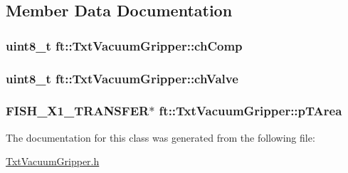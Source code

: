 \subsection{Member Data Documentation}
\subsubsection[{\texorpdfstring{ch\+Comp}{chComp}}]{\setlength{\rightskip}{0pt plus 5cm}uint8\+\_\+t ft\+::\+Txt\+Vacuum\+Gripper\+::ch\+Comp\hspace{0.3cm}{\ttfamily [protected]}}\hypertarget{classft_1_1_txt_vacuum_gripper_a28c6fcf1bb14dd5d00a9578f291c9fc4}{}\label{classft_1_1_txt_vacuum_gripper_a28c6fcf1bb14dd5d00a9578f291c9fc4}
\subsubsection[{\texorpdfstring{ch\+Valve}{chValve}}]{\setlength{\rightskip}{0pt plus 5cm}uint8\+\_\+t ft\+::\+Txt\+Vacuum\+Gripper\+::ch\+Valve\hspace{0.3cm}{\ttfamily [protected]}}\hypertarget{classft_1_1_txt_vacuum_gripper_aa0e9e057c407c46b273a39add7b63200}{}\label{classft_1_1_txt_vacuum_gripper_aa0e9e057c407c46b273a39add7b63200}
\subsubsection[{\texorpdfstring{p\+T\+Area}{pTArea}}]{\setlength{\rightskip}{0pt plus 5cm}F\+I\+S\+H\+\_\+\+X1\+\_\+\+T\+R\+A\+N\+S\+F\+ER$\ast$ ft\+::\+Txt\+Vacuum\+Gripper\+::p\+T\+Area\hspace{0.3cm}{\ttfamily [protected]}}\hypertarget{classft_1_1_txt_vacuum_gripper_ae5573d32320fc86aa2c70ebd1fef03ff}{}\label{classft_1_1_txt_vacuum_gripper_ae5573d32320fc86aa2c70ebd1fef03ff}


The documentation for this class was generated from the following file\+:\begin{DoxyCompactItemize}
\item 
\hyperlink{_txt_vacuum_gripper_8h}{Txt\+Vacuum\+Gripper.\+h}\end{DoxyCompactItemize}
